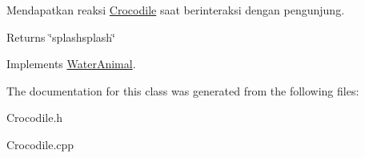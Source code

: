 Mendapatkan reaksi \hyperlink{classCrocodile}{Crocodile} saat berinteraksi dengan pengunjung. 

\begin{DoxyReturn}{Returns}
\char`\"{}splashsplash\char`\"{} 
\end{DoxyReturn}


Implements \hyperlink{classWaterAnimal}{Water\-Animal}.



The documentation for this class was generated from the following files\-:\begin{DoxyCompactItemize}
\item 
Crocodile.\-h\item 
Crocodile.\-cpp\end{DoxyCompactItemize}
